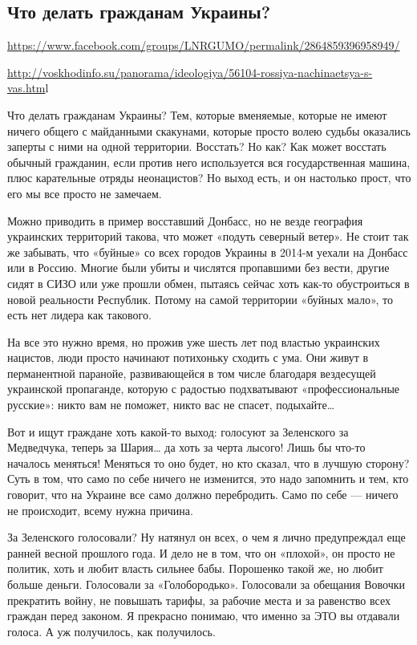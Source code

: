  
 
\subsection{Что делать гражданам Украины?}
\label{sec:21_07_2020.fb.lnr.9}
\url{https://www.facebook.com/groups/LNRGUMO/permalink/2864859396958949/}
  
\url{http://voskhodinfo.su/panorama/ideologiya/56104-rossiya-nachinaetsya-s-vas.htm}l

Что делать гражданам Украины? Тем, которые вменяемые, которые не имеют ничего
общего с майданными скакунами, которые просто волею судьбы оказались заперты с
ними на одной территории. Восстать? Но как? Как может восстать обычный
гражданин, если против него используется вся государственная машина, плюс
карательные отряды неонацистов? Но выход есть, и он настолько прост, что его мы
все просто не замечаем.

Можно приводить в пример восставший Донбасс, но не везде география украинских
территорий такова, что может «подуть северный ветер». Не стоит так же забывать,
что «буйные» со всех городов Украины в 2014-м уехали на Донбасс или в Россию.
Многие были убиты и числятся пропавшими без вести, другие сидят в СИЗО или уже
прошли обмен, пытаясь сейчас хоть как-то обустроиться в новой реальности
Республик. Потому на самой территории «буйных мало», то есть нет лидера как
такового.

На все это нужно время, но прожив уже шесть лет под властью украинских
нацистов, люди просто начинают потихоньку сходить с ума. Они живут в
перманентной паранойе, развивающейся в том числе благодаря вездесущей
украинской пропаганде, которую с радостью подхватывают «профессиональные
русские»: никто вам не поможет, никто вас не спасет, подыхайте…

Вот и ищут граждане хоть какой-то выход: голосуют за Зеленского за Медведчука,
теперь за Шария… да хоть за черта лысого! Лишь бы что-то началось меняться!
Меняться то оно будет, но кто сказал, что в лучшую сторону? Суть в том, что
само по себе ничего не изменится, это надо запомнить и тем, кто говорит, что на
Украине все само должно перебродить. Само по себе --- ничего не происходит,
всему нужна причина.

За Зеленского голосовали? Ну натянул он всех, о чем я лично предупреждал еще
ранней весной прошлого года. И дело не в том, что он «плохой», он просто не
политик, хоть и любит власть сильнее бабы. Порошенко такой же, но любит больше
деньги. Голосовали за «Голобородько». Голосовали за обещания Вовочки прекратить
войну, не повышать тарифы, за рабочие места и за равенство всех граждан перед
законом. Я прекрасно понимаю, что именно за ЭТО вы отдавали голоса. А уж
получилось, как получилось.

